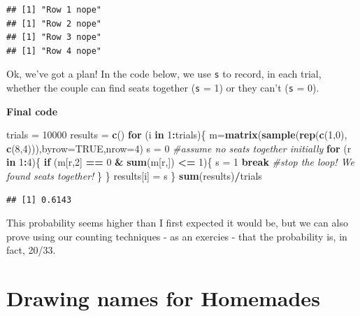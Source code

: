 \documentclass[
]{book}
\newenvironment{Shaded}{\begin{snugshade}}{\end{snugshade}}
\newcommand{\AttributeTok}[1]{\textcolor[rgb]{0.13,0.29,0.53}{#1}}
\newcommand{\CommentTok}[1]{\textcolor[rgb]{0.56,0.35,0.01}{\textit{#1}}}
\newcommand{\ConstantTok}[1]{\textcolor[rgb]{0.56,0.35,0.01}{#1}}
\newcommand{\ControlFlowTok}[1]{\textcolor[rgb]{0.13,0.29,0.53}{\textbf{#1}}}
\newcommand{\DecValTok}[1]{\textcolor[rgb]{0.00,0.00,0.81}{#1}}
\newcommand{\FunctionTok}[1]{\textcolor[rgb]{0.13,0.29,0.53}{\textbf{#1}}}
\newcommand{\NormalTok}[1]{#1}
\newcommand{\OtherTok}[1]{\textcolor[rgb]{0.56,0.35,0.01}{#1}}
\newcommand{\SpecialCharTok}[1]{\textcolor[rgb]{0.81,0.36,0.00}{\textbf{#1}}}
\theoremstyle{definition}
\theoremstyle{definition}
\theoremstyle{definition}
\theoremstyle{definition}
\theoremstyle{remark}
\begin{document}
\begin{verbatim}
## [1] "Row 1 nope"
## [1] "Row 2 nope"
## [1] "Row 3 nope"
## [1] "Row 4 nope"
\end{verbatim}

Ok, we've got a plan! In the code below, we use \texttt{s} to record, in each trial, whether the couple can find seats together (\texttt{s} = 1) or they can't (\texttt{s} = 0).

\textbf{Final code}

\begin{Shaded}
\begin{Highlighting}[]
\NormalTok{trials }\OtherTok{=} \DecValTok{10000}
\NormalTok{results }\OtherTok{=} \FunctionTok{c}\NormalTok{()}
\ControlFlowTok{for}\NormalTok{ (i }\ControlFlowTok{in} \DecValTok{1}\SpecialCharTok{:}\NormalTok{trials)\{}
\NormalTok{  m}\OtherTok{=}\FunctionTok{matrix}\NormalTok{(}\FunctionTok{sample}\NormalTok{(}\FunctionTok{rep}\NormalTok{(}\FunctionTok{c}\NormalTok{(}\DecValTok{1}\NormalTok{,}\DecValTok{0}\NormalTok{), }\FunctionTok{c}\NormalTok{(}\DecValTok{8}\NormalTok{,}\DecValTok{4}\NormalTok{))),}\AttributeTok{byrow=}\ConstantTok{TRUE}\NormalTok{,}\AttributeTok{nrow=}\DecValTok{4}\NormalTok{)}
\NormalTok{  s }\OtherTok{=} \DecValTok{0} \CommentTok{\#assume no seats together initially}
  \ControlFlowTok{for}\NormalTok{ (r }\ControlFlowTok{in} \DecValTok{1}\SpecialCharTok{:}\DecValTok{4}\NormalTok{)\{}
    \ControlFlowTok{if}\NormalTok{ (m[r,}\DecValTok{2}\NormalTok{] }\SpecialCharTok{==} \DecValTok{0} \SpecialCharTok{\&} \FunctionTok{sum}\NormalTok{(m[r,]) }\SpecialCharTok{\textless{}=} \DecValTok{1}\NormalTok{)\{}
\NormalTok{      s }\OtherTok{=} \DecValTok{1}
      \ControlFlowTok{break} \CommentTok{\#stop the loop! We found seats together!}
\NormalTok{    \}}
\NormalTok{  \}}
\NormalTok{  results[i] }\OtherTok{=}\NormalTok{ s}
\NormalTok{\}}
\FunctionTok{sum}\NormalTok{(results)}\SpecialCharTok{/}\NormalTok{trials}
\end{Highlighting}
\end{Shaded}

\begin{verbatim}
## [1] 0.6143
\end{verbatim}

This probability seems higher than I first expected it would be, but we can also prove using our counting techniques - as an exercies - that the probability is, in fact, 20/33.

\section{Drawing names for Homemades}\label{drawing-names-for-homemades}
\end{document}
